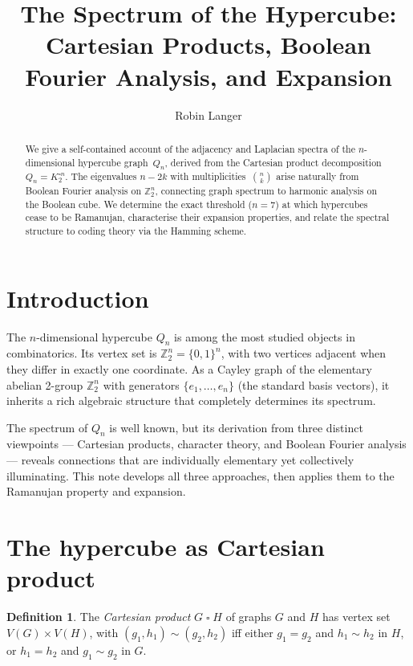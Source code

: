 \documentclass[11pt,a4paper]{article}
\title{The Spectrum of the Hypercube:\\
  Cartesian Products, Boolean Fourier Analysis, and Expansion}
\author{Robin Langer}
\date{}
\theoremstyle{plain}
\theoremstyle{definition}
\newtheorem{definition}[theorem]{Definition}
\theoremstyle{remark}
\newcommand{\Z}{\mathbb{Z}}
\begin{document}
\maketitle

\begin{abstract}
We give a self-contained account of the adjacency and Laplacian spectra of the
$n$-dimensional hypercube graph~$Q_n$, derived from the Cartesian product
decomposition $Q_n = K_2^{\square n}$. The eigenvalues $n - 2k$ with
multiplicities~$\binom{n}{k}$ arise naturally from Boolean Fourier analysis on
$\Z_2^n$, connecting graph spectrum to harmonic analysis on the Boolean cube.
We determine the exact threshold ($n = 7$) at which hypercubes cease to be
Ramanujan, characterise their expansion properties, and relate the spectral
structure to coding theory via the Hamming scheme.
\end{abstract}


\section{Introduction}

The $n$-dimensional hypercube $Q_n$ is among the most studied objects in
combinatorics. Its vertex set is $\Z_2^n = \{0,1\}^n$, with two vertices
adjacent when they differ in exactly one coordinate. As a Cayley graph of the
elementary abelian 2-group $\Z_2^n$ with generators $\{e_1, \ldots, e_n\}$
(the standard basis vectors), it inherits a rich algebraic structure that
completely determines its spectrum.

The spectrum of $Q_n$ is well known, but its derivation from three distinct
viewpoints --- Cartesian products, character theory, and Boolean Fourier
analysis --- reveals connections that are individually elementary yet
collectively illuminating. This note develops all three approaches, then
applies them to the Ramanujan property and expansion.


\section{The hypercube as Cartesian product}

\begin{definition}
The \emph{Cartesian product} $G \mathbin{\square} H$ of graphs $G$ and $H$
has vertex set $V(G) \times V(H)$, with $(g_1, h_1) \sim (g_2, h_2)$ iff
either $g_1 = g_2$ and $h_1 \sim h_2$ in $H$, or $h_1 = h_2$ and
$g_1 \sim g_2$ in $G$.
\end{definition}
\end{document}
